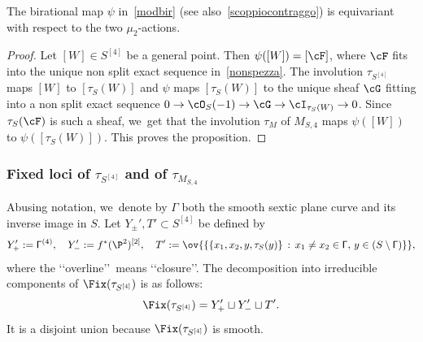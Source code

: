 \begin{prop}\label{prop:azionicompat}
The birational map $\psi$ in~\eqref{modbir} (see also~\eqref{scoppiocontraggo}) is equivariant with respect to the two $\mu_2$-actions.
\end{prop}

\begin{proof}
Let $[W]\in S^{[4]}$ be a general point. Then $\psi([W])=[\cF]$, where $\cF$ fits into the unique non split exact sequence in~\eqref{nonspezza}. The involution $\tau_{S^{[4]}}$ maps $[W]$ to $[\tau_S(W)]$ and $\psi$ maps $[\tau_S(W)]$ to the unique sheaf $\cG$ fitting into a non split exact sequence $0\to\cO_S(-1)\to\cG\to \cI_{\tau_S(W)}\to 0$. Since $\tau_S(\cF)$ is such a sheaf, we~get that the involution $\tau_M$ of $M_{S,4}$ maps $\psi([W])$ to $\psi([\tau_S(W)])$. This proves the proposition.
\end{proof}

\subsubsection*{Fixed loci of $\tau_{S^{[4]}}$ and of $\tau_{M_{S,4}}$}

Abusing notation, we~denote by $\mathsf{\Gamma}$ both the smooth sextic plane curve and its inverse image in $S$.
Let $Y_{\pm}',T'\subset S^{[4]}$ be defined by
\begin{equation*}
Y_+':=\mathsf{\Gamma}^{(4)},\quad Y_-':=f^*(\P^2)^{[2]},\quad
T':=\ov{\{\{x_1,x_2,y,\tau_S(y)\} \,:\, x_1\not= x_2\in
\mathsf{\Gamma},\, y\in(S\setminus\mathsf{\Gamma})\}},
\end{equation*}
where the \lq\lq overline\rq\rq\ means \lq\lq closure\rq\rq.
The decomposition into irreducible components of $\Fix(\tau_{S^{[4]}})$ is as follows:
\begin{equation*}
\Fix(\tau_{S^{[4]}})=Y_+'\sqcup Y_-'\sqcup T'.
\end{equation*}
It is a disjoint union because $\Fix(\tau_{S^{[4]}})$ is smooth.

